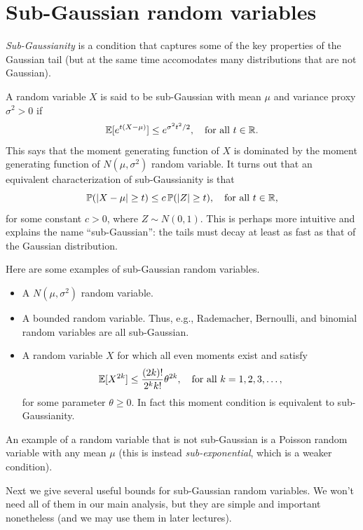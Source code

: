 \documentclass{article}
\begin{document}
\section{Sub-Gaussian random variables}

\emph{Sub-Gaussianity} is a condition that captures some of the key properties
of the Gaussian tail (but at the same time accomodates many distributions that
are not Gaussian).   

A random variable $X$ is said to be sub-Gaussian with mean $\mu$ and
variance proxy $\sigma^2>0$ if   
\[
\mathbb{E}[ e^{t (X - \mu)} ] \leq e^{\sigma^2 t^2 / 2}, \quad \text{for all $t \in
  \mathbb{R}$}. 
\]
This says that the moment generating function of $X$ is dominated by the moment
generating function of $N(\mu, \sigma^2)$ random variable. It turns out that an
equivalent characterization of sub-Gaussianity is that
\[
\mathbb{P}(|X-\mu| \geq t) \leq c \, \mathbb{P}(|Z| \geq t), \quad \text{for all $t \in \mathbb{R}$},
\]
for some constant $c>0$, where $Z \sim N(0,1)$. This is perhaps more intuitive
and explains the name ``sub-Gaussian'': the tails must decay at least as fast as
that of the Gaussian distribution. 


Here are some examples of sub-Gaussian random variables.

\begin{itemize}
\item A $N(\mu, \sigma^2)$ random variable. 
\item A bounded random variable. Thus, e.g., Rademacher, Bernoulli, and binomial   
  random variables are all sub-Gaussian.
\item A random variable $X$ for which all even moments exist and satisfy  
\[
\mathbb{E}[X^{2k}] \leq \frac{(2k)!}{2^k k!} \theta^{2k}, \quad \text{for all
  $k=1,2,3,\dots$},
\]
for some parameter $\theta \geq 0$. In fact this moment condition is equivalent
to sub-Gaussianity.   
\end{itemize}

An example of a random variable that is not sub-Gaussian is a Poisson random
variable with any mean $\mu$ (this is instead \emph{sub-exponential}, which is a 
weaker condition).

Next we give several useful bounds for sub-Gaussian random variables. We won't
need all of them in our main analysis, but they are simple and important
nonetheless (and we may use them in later lectures).  
\end{document}
